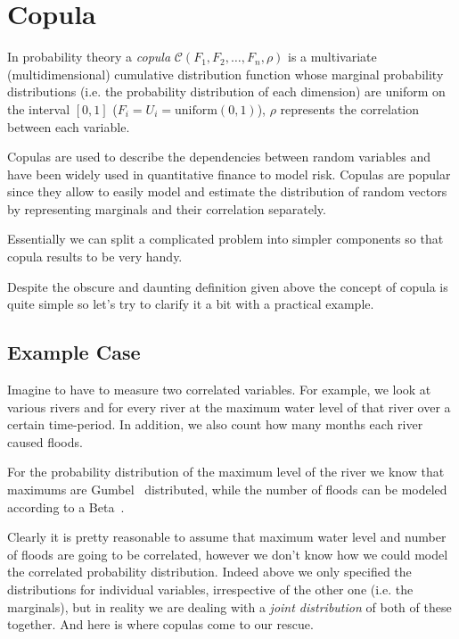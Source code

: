 \section{Copula}
\label{copula}

In probability theory a \emph{copula} $\mathcal{C}(F_1, F_2, \ldots, F_n, \rho)$ is a multivariate (multidimensional) cumulative distribution function whose marginal probability distributions (i.e. the probability distribution of each dimension) are uniform on the interval $[0, 1]$ ($F_i = U_i =\mathrm{uniform}(0,1)$), \(\rho\) represents the correlation between each variable.

Copulas are used to describe the dependencies between random variables and have been widely used in quantitative finance to model risk. Copulas are popular since they allow to easily model and estimate the distribution of random vectors by representing marginals and their correlation separately.

Essentially we can split a complicated problem into simpler components so that copula results to be very handy.

Despite the obscure and daunting definition given above the concept of copula is quite simple so let's try to clarify it a bit with a practical example.

\subsection{Example Case}
\label{example-problem-case}

Imagine to have to measure two correlated variables. For example, we look at various rivers and for every river at the maximum water level of that river over a certain time-period. In addition, we also count how many months each river caused floods.

For the probability distribution of the maximum level of the river we know that maximums are Gumbel~\cite{bib:gumbel} distributed, while the number of floods can be modeled according to a Beta~\cite{bib:eta}.

Clearly it is pretty reasonable to assume that maximum water level and number of floods are going to be correlated, however we don't know how we could model the correlated probability distribution.
Indeed above we only specified the distributions for individual variables, irrespective of the other one (i.e. the marginals), but in reality we are dealing with a \emph{joint distribution} of both of these together. And here is where copulas come to our rescue.

